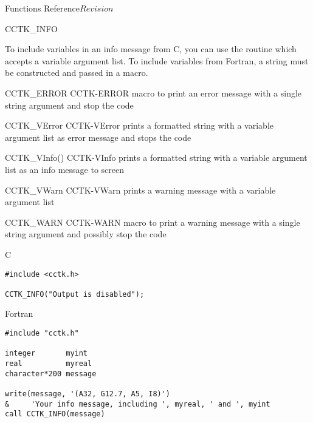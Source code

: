 \begin{cactuspart}{ Functions Reference}{}{$Revision$}
\begin{FunctionDescription}{CCTK\_INFO}
\begin{Discussion}
To include variables in an info message from C, you can use the routine
 which accepts a variable argument list.
To include variables from Fortran, a string must be constructed and passed
in a  macro.
\end{Discussion}

\begin{SeeAlsoSection}
\begin{SeeAlso2} {CCTK\_ERROR} {CCTK-ERROR}
macro to print an error message with a single string argument and stop
the code
\end{SeeAlso2}
\begin{SeeAlso2} {CCTK\_VError} {CCTK-VError}
prints a formatted string with a variable argument list as error
message and stops the code
\end{SeeAlso2}
\begin{SeeAlso2} {CCTK\_VInfo()} {CCTK-VInfo}
prints a formatted string with a variable argument list as an info message to
screen
\end{SeeAlso2}
\begin{SeeAlso2} {CCTK\_VWarn} {CCTK-VWarn}
prints a warning message with a variable argument list
\end{SeeAlso2}
\begin{SeeAlso2} {CCTK\_WARN} {CCTK-WARN}
macro to print a warning message with a single string argument and
possibly stop the code
\end{SeeAlso2}
\end{SeeAlsoSection}

\begin{ExampleSection}
\begin{Example}{C}
\begin{verbatim}
#include <cctk.h>

CCTK_INFO("Output is disabled");
\end{verbatim}
\end{Example}
\begin{Example}{Fortran}
\begin{verbatim}
#include "cctk.h"

integer       myint
real          myreal
character*200 message

write(message, '(A32, G12.7, A5, I8)')
&     'Your info message, including ', myreal, ' and ', myint
call CCTK_INFO(message)
\end{verbatim}
\end{Example}
\end{ExampleSection}
\end{FunctionDescription}


\end{cactuspart}
